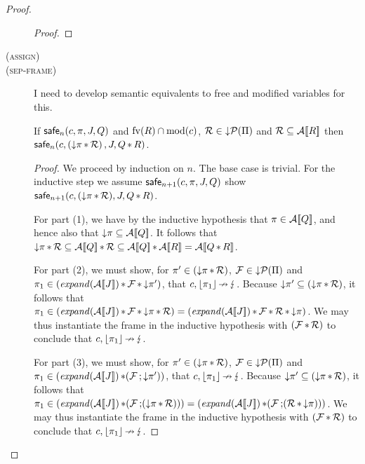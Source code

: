 \documentclass[11pt]{report}
\begin{document}
\begin{proof}
\begin{description}
\begin{proof}
		\end{proof}
		
		\item[(\textsc{assign})] 
		
		\item[(\textsc{sep-frame})] I need to develop semantic equivalents to free and modified variables for this. 
		
		\begin{lemma}
			\label{lem:sep-frame-sound}
			If $\safe{n}{c,\pi,J,Q}$ and $\fv{R} \cap \mod{c}$, $\mathcal{R} \in \downpstates$ and $\mathcal{R} \subseteq \dna{R}$ then $\safe{n}{c,\left(\down \pi \sep \mathcal{R}\right), J , Q \sep R}$. 
		\end{lemma}
		
		\begin{proof}
			We proceed by induction on $n$. The base case is trivial. For the inductive step we assume $\safe{n+1}{c, \pi, J, Q}$ show $\safe{n+1}{c, (\down \pi \sep \mathcal{R}), J, Q \sep R}$. 
			
			For part (1), we have by the inductive hypothesis that $\pi \in \dna{Q}$, and hence also that $\down \pi \subseteq \dna{Q}$. It follows that $\down \pi \sep \mathcal{R} \subseteq \dna{Q} \sep \mathcal{R} \subseteq \dna{Q} \sep \dna{R} = \dna{Q \sep R}$. 
			
			For part (2), we must show, for $\pi' \in (\down \pi \sep \mathcal{R})$, $\mathcal{F} \in \downpstates$ and $\pi_1 \in (\sexpand{\dna{J}} \sep \mathcal{F} \sep \down \pi')$, that $c,\concst{\pi_1} \noestep \abort$. Because $\down \pi' \subseteq (\down \pi \sep \mathcal{R})$, it follows that $\pi_1 \in (\sexpand{\dna{J}} \sep \mathcal{F} \sep \down \pi \sep \mathcal{R}) = (\sexpand{\dna{J}} \sep \mathcal{F} \sep \mathcal{R} \sep \down \pi)$. We may thus instantiate the frame in the inductive hypothesis with $(\mathcal{F} \sep \mathcal{R})$ to conclude that $c,\concst{\pi_1} \noestep \abort$. 
			
			For part (3), we must show, for $\pi' \in (\down \pi \sep \mathcal{R})$, $\mathcal{F} \in \downpstates$ and $\pi_1 \in (\sexpand{\dna{J}} \sep (\mathcal{F} \seq \down \pi'))$, that $c,\concst{\pi_1} \noestep \abort$. Because $\down \pi' \subseteq (\down \pi \sep \mathcal{R})$, it follows that $\pi_1 \in (\sexpand{\dna{J}} \sep (\mathcal{F} \seq (\down \pi \sep \mathcal{R}))) = (\sexpand{\dna{J}} \sep (\mathcal{F} \seq (\mathcal{R} \sep \down \pi )))$. We may thus instantiate the frame in the inductive hypothesis with $(\mathcal{F} \sep \mathcal{R})$ to conclude that $c,\concst{\pi_1} \noestep \abort$. 
			 
		\end{proof}
		
	\end{description}
\end{proof}
\end{document}
